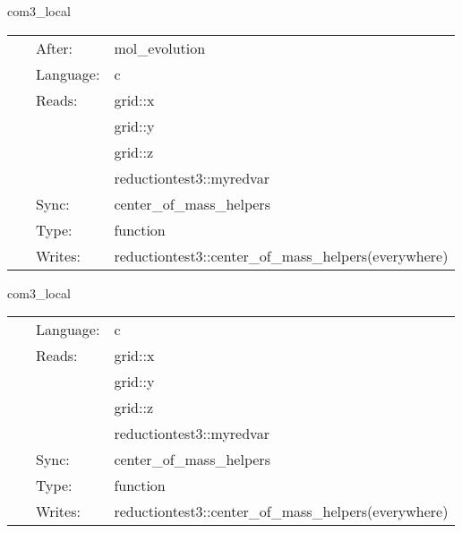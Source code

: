 \vspace{5mm}


\hspace{5mm} com3\_local 

\hspace{5mm}{\it setup integrands for com calculation } 


\hspace{5mm}

 \begin{tabular*}{160mm}{cll} 
~ & After:  & mol\_evolution \\ 
~ & Language:  & c \\ 
~ & Reads:  & grid::x \\ 
~& ~ &grid::y\\ 
~& ~ &grid::z\\ 
~& ~ &reductiontest3::myredvar\\ 
~ & Sync:  & center\_of\_mass\_helpers \\ 
~ & Type:  & function \\ 
~ & Writes:  & reductiontest3::center\_of\_mass\_helpers(everywhere) \\ 
\end{tabular*} 


\vspace{5mm}


\hspace{5mm} com3\_local 

\hspace{5mm}{\it setup integrands for com calculation } 


\hspace{5mm}

 \begin{tabular*}{160mm}{cll} 
~ & Language:  & c \\ 
~ & Reads:  & grid::x \\ 
~& ~ &grid::y\\ 
~& ~ &grid::z\\ 
~& ~ &reductiontest3::myredvar\\ 
~ & Sync:  & center\_of\_mass\_helpers \\ 
~ & Type:  & function \\ 
~ & Writes:  & reductiontest3::center\_of\_mass\_helpers(everywhere) \\ 
\end{tabular*} 


\vspace{5mm}

